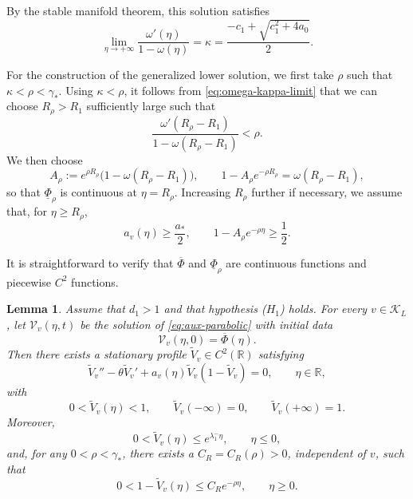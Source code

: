 \documentclass[preprint,sort&compress,final,12pt]{elsarticle}
\newtheorem{lemma}[theorem]{Lemma}
\numberwithin{equation}{section}
\begin{document}
By the stable manifold theorem, this solution satisfies
\begin{equation}\label{eq:omega-kappa-limit}
\lim_{\eta\to+\infty}\frac{\omega'(\eta)}{1-\omega(\eta)}
=\kappa=\frac{-c_1+\sqrt{c_1^2+4a_0}}{2}.
\end{equation}

For the construction of the generalized lower solution, we first take $\rho$ such that $\kappa<\rho<\gamma_*$. Using $\kappa<\rho$, it follows from \eqref{eq:omega-kappa-limit} that we can choose $R_\rho>R_1$ sufficiently large such that
\begin{equation}\label{eq:corner-choice}
\frac{\omega'(R_\rho-R_1)}{1-\omega(R_\rho-R_1)}<\rho.
\end{equation}
We then choose
\begin{equation}\label{eq:Arho-choice}
A_\rho:=e^{\rho R_\rho}\bigl(1-\omega(R_\rho-R_1)\bigr),
\qquad
1-A_\rho e^{-\rho R_\rho}=\omega(R_\rho-R_1),
\end{equation}
so that $\underline\Phi_\rho$ is continuous at $\eta=R_\rho$. Increasing $R_\rho$ further if necessary, we assume that, for $\eta\ge R_\rho$,
\begin{equation}\label{eq:est1}
a_v(\eta)\ge\frac{a_*}{2},
\qquad
1-A_\rho e^{-\rho\eta}\ge\frac{1}{2}.
\end{equation}


It is straightforward to verify that $\overline\Phi$ and $\underline\Phi_\rho$ are continuous functions and piecewise $C^2$ functions.

\begin{lemma}\label{lem:stationary-profile}
Assume that $d_1>1$ and that hypothesis ($H_1$) holds. For every $v\in\mathcal K_L$, let $\mathcal V_v(\eta,t)$ be the solution of \eqref{eq:aux-parabolic} with initial data
\begin{equation*}
\mathcal V_v(\eta,0)=\overline\Phi(\eta).
\end{equation*}
Then there exists a stationary profile $\widetilde V_v\in C^2(\mathbb R)$ satisfying
\begin{equation}\label{eq:stationary-profile}
\widetilde V_v''-\theta\widetilde V_v'
+a_v(\eta)\widetilde V_v(1-\widetilde V_v)=0,
\qquad \eta\in\mathbb R,
\end{equation}
with
\begin{equation*}
0<\widetilde V_v(\eta)<1,\qquad
\widetilde V_v(-\infty)=0,\qquad
\widetilde V_v(+\infty)=1.
\end{equation*}
Moreover,
\begin{equation}\label{eq:left-tail-eta}
0<\widetilde V_v(\eta)\le e^{\lambda_1^{-}\eta},
\qquad \eta\le0,
\end{equation}
and, for any $0<\rho<\gamma_*$, there exists a $C_R=C_R(\rho)>0$, independent of $v$, such that
\begin{equation}\label{eq:right-tail-eta}
0<1-\widetilde V_v(\eta)\le C_Re^{-\rho\eta},
\qquad \eta\ge0.
\end{equation}
\end{lemma}
\end{document}
